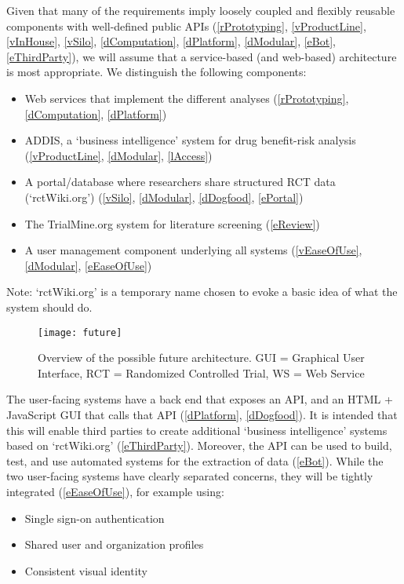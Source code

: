 \documentclass[a4paper]{article}
\begin{document}
Given that many of the requirements imply loosely coupled and flexibly reusable components with well-defined public APIs (\ref{rPrototyping}, \ref{vProductLine}, \ref{vInHouse}, \ref{vSilo}, \ref{dComputation}, \ref{dPlatform}, \ref{dModular}, \ref{eBot}, \ref{eThirdParty}), we will assume that a service-based (and web-based) architecture is most appropriate.
We distinguish the following components:
\begin{itemize}
\item Web services that implement the different analyses (\ref{rPrototyping}, \ref{dComputation}, \ref{dPlatform})
\item ADDIS, a `business intelligence' system for drug benefit-risk analysis (\ref{vProductLine}, \ref{dModular}, \ref{lAccess})
\item A portal/database where researchers share structured RCT data (`rctWiki.org') (\ref{vSilo}, \ref{dModular}, \ref{dDogfood}, \ref{ePortal})
\item The TrialMine.org system for literature screening (\ref{eReview})
\item A user management component underlying all systems (\ref{vEaseOfUse}, \ref{dModular}, \ref{eEaseOfUse})
\end{itemize}
Note: `rctWiki.org' is a temporary name chosen to evoke a basic idea of what the system should do.

\begin{figure}[h]
\centering
\texttt{[image: future]}
\caption{Overview of the possible future architecture. GUI = Graphical User Interface, RCT = Randomized Controlled Trial, WS = Web Service}
\end{figure}

The user-facing systems have a back end that exposes an API, and an HTML + JavaScript GUI that calls that API (\ref{dPlatform}, \ref{dDogfood}).
It is intended that this will enable third parties to create additional `business intelligence' systems based on `rctWiki.org' (\ref{eThirdParty}).
Moreover, the API can be used to build, test, and use automated systems for the extraction of data (\ref{eBot}).
While the two user-facing systems have clearly separated concerns, they will be tightly integrated (\ref{eEaseOfUse}), for example using:
\begin{itemize}
\item Single sign-on authentication
\item Shared user and organization profiles
\item Consistent visual identity
\end{itemize}
\end{document}
